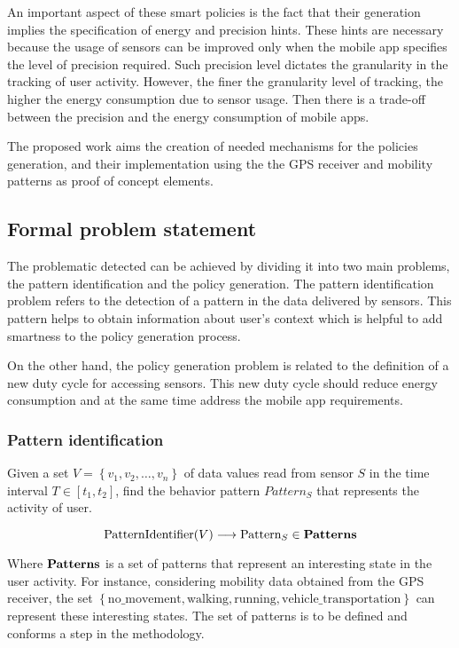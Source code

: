 \documentclass{report}
\begin{document}
An important aspect of these smart policies is the fact that their generation implies the specification of energy and precision hints.
These hints are necessary because the usage of sensors can be improved only when the mobile app specifies the level of precision required.
Such precision level dictates the granularity in the tracking of user activity.
However, the finer the granularity level of tracking, the higher the energy consumption due to sensor usage.
Then there is a trade-off between the precision and the energy consumption of mobile apps.

The proposed work aims the creation of needed mechanisms for the policies generation, and their implementation using the the GPS receiver and mobility patterns as proof of concept elements.

\subsection{Formal problem statement}
The problematic detected can be achieved by dividing it into two main problems, the pattern identification and the policy generation.
The pattern identification problem refers to the detection of a pattern in the data delivered by sensors.
This pattern helps to obtain information about user's context which is helpful to add smartness to the policy generation process.

On the other hand, the policy generation problem is related to the definition of a new duty cycle for accessing sensors.
This new duty cycle should reduce energy consumption and at the same time address the mobile app requirements.
\subsubsection{Pattern identification}

Given a set $V = \left\{v_{1}, v_{2}, \dotsc, v_{n}\right\}$ of data values read from sensor $S$ in the time interval $T  \in [t_{1}, t_{2}]$, find the behavior pattern $Pattern_{S}$ that represents the activity of user.

\begin{equation}
\text{PatternIdentifier}( V ) \longrightarrow{} \text{Pattern}_{S} \in \text{\textbf{Patterns}}
\end{equation}

Where $\text{\textbf{Patterns}}$ is a set of patterns that represent an interesting state in the user activity.
For instance, considering mobility data obtained from the GPS receiver, the set $\left\{\text{no\_movement}, \text{walking}, \text{running}, \text{vehicle\_transportation}\right\}$ can represent these interesting states.
The set of patterns is to be defined and conforms a step in the methodology.
\end{document}
